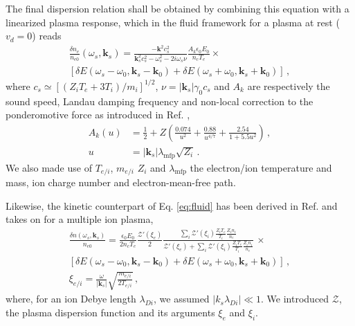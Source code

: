 \documentclass[
 reprint,
 amsmath,amssymb,
 aps,
]{revtex4-1}
\begin{document}
The final dispersion relation  shall be obtained by combining this equation with a linearized plasma response, which in the fluid framework for a plasma at rest ($v_d=0$) reads 
\begin{align}
   \frac{\delta n_e }{n_{e0}}(\omega_s,\mathbf{k}_s) = \frac{-\mathbf{k}^2c_s^2}{ \mathbf{k}_s^2c_s^2-\omega_s^2 -2i\omega_s \nu} \frac{A_k\epsilon_0 E_0}{n_c T_e}\times \nonumber\\ \left[\delta E(\omega_s-\omega_0, \mathbf{k}_s-\mathbf{k}_0) +\delta E(\omega_s+\omega_0, \mathbf{k}_s+\mathbf{k}_0) \right] \, ,\label{eq:fluid}
\end{align}
where $c_s\simeq [(Z_iT_e+3 T_i)/m_i]^{1/2}$, $\nu=\vert\mathbf{k}_s\vert \gamma_0 c_s$ and $A_k$ are respectively  the sound speed, Landau damping frequency and non-local correction to the ponderomotive force  as introduced in Ref. \cite[]{Bychenkov_2000}, 
\begin{align}
     A_k(u)   &= \frac{1}{2} +Z\left( \frac{0.074}{u^2}+ \frac{0.88}{u^{4/7}} + \frac{2.54}{1+5.5u^2} \right) \, ,\nonumber \\ 
     u &=\vert \mathbf{k}_s \vert\lambda_\mathrm{mfp} \sqrt{Z_i}\label{eq:nl}\, .
\end{align}
We also made use of $T_{e/i}$, $m_{e/i}$ $Z_i$ and $\lambda_\mathrm{mfp}$ the electron/ion temperature and mass, ion charge number and electron-mean-free path.

Likewise, the kinetic counterpart of Eq. \eqref{eq:fluid} has been derived in Ref. \cite[]{POF_Drake_1973} and    takes on for a multiple ion plasma, 
\begin{align}
 \frac{ \delta n (\omega_s, \mathbf{k}_s ) }{n_{e0}}  =   \frac{ \epsilon_0  E_0 }{ 2n_c T_e } 
 \frac{\mathcal{Z}'( \xi_e) }{2}
 \frac{\sum_i\mathcal{Z}'( \xi_i)\frac{  Z_iT_e}{ T_i }\frac{  Z_in_i}{ n_e }   }{  \mathcal{Z}'( \xi_e)+ \sum_i\mathcal{Z}'( \xi_i)\frac{  Z_iT_e}{ T_i }\frac{ Z_i n_i}{ n_e }  }
 \,  
 \times \nonumber\\ \left[\delta E(\omega_s-\omega_0, \mathbf{k}_s-\mathbf{k}_0) +\delta E(\omega_s+\omega_0, \mathbf{k}_s+\mathbf{k}_0) \right] %
   \, ,\label{eq:drake}\\
   \xi_{e/i} = \frac{   \omega }{   \vert\mathbf{k}_s\vert }  \sqrt{ \frac{ m_{e/i } }{ 2T_{e/i }}  }  \label{eq:xi} \, , 
 \end{align}
 where, for an ion Debye length $\lambda_{Di}$, we assumed $\vert k_s \lambda_{Di} \vert \ll 1$. 
We introduced $\mathcal{Z}$, the plasma dispersion function \cite{Fried_Gell-Mann_1960} and its arguments $\xi_{e } $ and $\xi_{i }$. %
\end{document}
